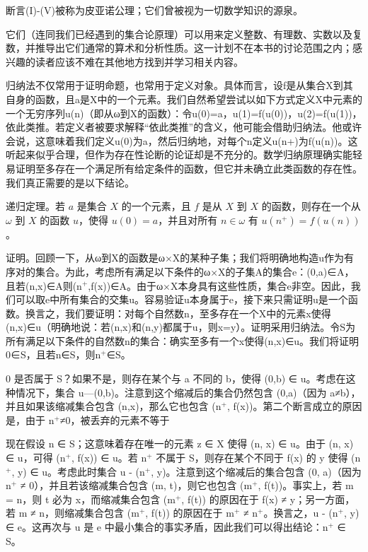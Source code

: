 \documentclass[12pt,a4paper]{ctexbook}
\theoremstyle{definition}
\theoremstyle{remark}
\begin{document}
{断言(I)-(V)被称为皮亚诺公理；它们曾被视为一切数学知识的源泉。

它们（连同我们已经遇到的集合论原理）可以用来定义整数、有理数、实数以及复数，并推导出它们通常的算术和分析性质。这一计划不在本书的讨论范围之内；感兴趣的读者应该不难在其他地方找到并学习相关内容。

归纳法不仅常用于证明命题，也常用于定义对象。具体而言，设f是从集合X到其自身的函数，且a是X中的一个元素。我们自然希望尝试以如下方式定义X中元素的一个无穷序列{u(n)}（即从ω到X的函数）：令u(0)=a，u(1)=f(u(0))，u(2)=f(u(1))，依此类推。若定义者被要求解释“依此类推”的含义，他可能会借助归纳法。他或许会说，这意味着我们定义u(0)为a，然后归纳地，对每个n定义u(n+)为f(u(n))。这听起来似乎合理，但作为存在性论断的论证却是不充分的。数学归纳原理确实能轻易证明至多存在一个满足所有给定条件的函数，但它并未确立此类函数的存在性。我们真正需要的是以下结论。

递归定理。若 \(a\) 是集合 \(X\) 的一个元素，且 \(f\) 是从 \(X\) 到 \(X\) 的函数，则存在一个从 \(\omega\) 到 \(X\) 的函数 \(u\)，使得 \(u(0) = a\)，并且对所有 \(n \in \omega\) 有 \(u(n^+) = f(u(n))\)。

证明。回顾一下，从ω到X的函数是ω×X的某种子集；我们将明确地构造u作为有序对的集合。为此，考虑所有满足以下条件的ω×X的子集A的集合e：(0,a)∈A，且若(n,x)∈A则(n$^{+}$,f(x))∈A。由于ω×X本身具有这些性质，集合e非空。因此，我们可以取e中所有集合的交集u。容易验证u本身属于e，接下来只需证明u是一个函数。换言之，我们要证明：对每个自然数n，至多存在一个X中的元素x使得(n,x)∈u（明确地说：若(n,x)和(n,y)都属于u，则x=y）。证明采用归纳法。令S为所有满足以下条件的自然数n的集合：确实至多有一个x使得(n,x)∈u。我们将证明0∈S，且若n∈S，则n$^{+}$∈S。

0 是否属于 S？如果不是，则存在某个与 a 不同的 b，使得 (0,b) ∈ u。考虑在这种情况下，集合 u—{(0,b)}。注意到这个缩减后的集合仍然包含 (0,a)（因为 a≠b），并且如果该缩减集合包含 (n,x)，那么它也包含 (n$^{+}$, f(x))。第二个断言成立的原因是，由于 n$^{+}$≠0，被丢弃的元素不等于

现在假设 n ∈ S；这意味着存在唯一的元素 z ∈ X 使得 (n, x) ∈ u。由于 (n, x) ∈ u，可得 (n$^{+}$, f(x)) ∈ u。若 n$^{+}$ 不属于 S，则存在某个不同于 f(x) 的 y 使得 (n$^{+}$, y) ∈ u。考虑此时集合 u - {(n$^{+}$, y)}。注意到这个缩减后的集合包含 (0, a)（因为 n$^{+}$ ≠ 0），并且若该缩减集合包含 (m, t)，则它也包含 (m$^{+}$, f(t))。事实上，若 m = n，则 t 必为 x，而缩减集合包含 (m$^{+}$, f(t)) 的原因在于 f(x) ≠ y；另一方面，若 m ≠ n，则缩减集合包含 (m$^{+}$, f(t)) 的原因在于 m$^{+}$ ≠ n$^{+}$。换言之，u - {(n$^{+}$, y)} ∈ e。这再次与 u 是 e 中最小集合的事实矛盾，因此我们可以得出结论：n$^{+}$ ∈ S。

}
\end{document}
